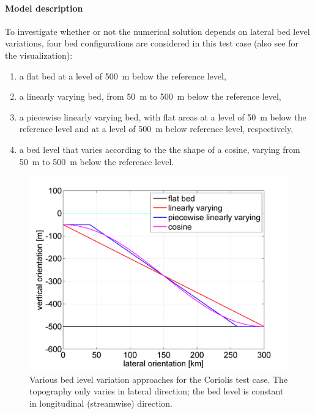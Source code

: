 \paragraph*{Model description}
To investigate whether or not the numerical solution depends on lateral bed level variations, four bed configurations are considered in this test case (also see  for the visualization):
\begin{enumerate}
\item a flat bed at a level of 500~m below the reference level,
\item a linearly varying bed, from 50~m to 500~m below the reference level,
\item a piecewise linearly varying bed, with flat areas at a level of 50~m below the reference level and at a level of 500~m below reference level, respectively,
\item a bed level that varies according to the the shape of a cosine, varying from 50~m to 500~m below the reference level.
\end{enumerate}
\begin{figure}[h!]
\begin{center}
\includegraphics[width=0.55\columnwidth]{figures/coriolisstraightconfig.png}
\end{center}\caption{Various bed level variation approaches for the Coriolis test case. The topography only varies in lateral direction; the bed level is constant in longitudinal (streamwise) direction. \label{fig:coriolisbathymetry}}
\end{figure}

